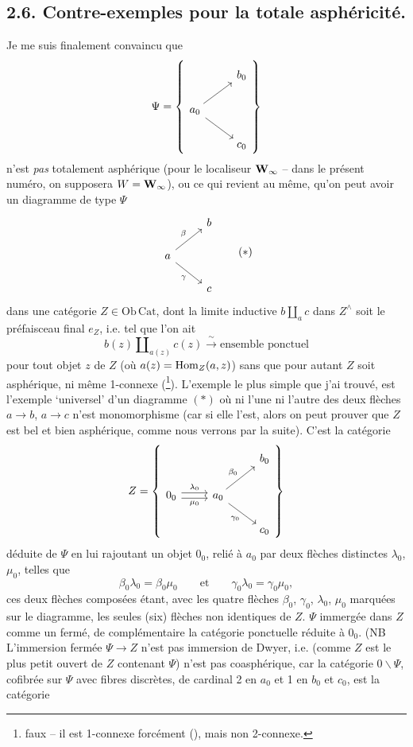 \subsection*{2.6. Contre-exemples pour la totale asphéricité.}

Je me suis finalement convaincu que
\[
\Psi = \left\{
\begin{tikzcd}
& b_0 \\
a_0 \arrow[ur] \arrow[dr] & \\
& c_0
\end{tikzcd}
\right\}
\]
n'est \textit{pas} totalement asphérique (pour le localiseur $\mathbf{W}_{\infty}$ -- dans le présent numéro, on supposera $W = \mathbf{W}_{\infty}$), ou ce qui revient au même, qu'on peut avoir un diagramme de type $\Psi$
\[
\begin{tikzcd}
& b \\
a \arrow[ur, "\beta"] \arrow[dr, "\gamma"'] & \\
& c
\end{tikzcd}
\tag*{$(*)$}
\]
dans une catégorie $Z \in \mathrm{Ob}\,\mathrm{Cat}$, dont la limite inductive $b \amalg_a c$ dans $Z^{\wedge}$ soit le préfaisceau final $e_Z$, i.e. tel que l'on ait
\[ b(z) \amalg_{a(z)} c(z) \xrightarrow{\ \sim\ } \text{ensemble ponctuel} \]
pour tout objet $z$ de $Z$ (où $a(z) = \mathrm{Hom}_Z(a,z)$) sans que pour autant $Z$ soit asphérique, ni même 1-connexe (\footnote[5]{faux -- il est 1-connexe forcément (\footnotemark[6]), mais non 2-connexe.}). L'exemple le plus simple que j'ai trouvé, est l'exemple ‘universel’ d'un diagramme $(*)$ où ni l'une ni l'autre des deux flèches $a \longrightarrow b$, $a \longrightarrow c$ n'est monomorphisme (car si elle l'est, alors on peut prouver que $Z$ est bel et bien asphérique, comme nous verrons par la suite). C'est la catégorie
\[
Z = \left\{
\begin{tikzcd}
& & b_0 \\
0_0 \arrow[r, shift left, "\lambda_0"] \arrow[r, shift right, "\mu_0"'] & a_0 \arrow[ur, "\beta_0"] \arrow[dr, "\gamma_0"'] & \\
& & c_0
\end{tikzcd}
\right\}
\]
déduite de $\Psi$ en lui rajoutant un objet $0_0$, relié à $a_0$ par deux flèches distinctes $\lambda_0$, $\mu_0$, telles que
\[ \beta_0\lambda_0 = \beta_0\mu_0 \qquad \text{et} \qquad \gamma_0\lambda_0 = \gamma_0\mu_0, \]
ces deux flèches composées étant, avec les quatre flèches $\beta_0$, $\gamma_0$, $\lambda_0$, $\mu_0$ marquées sur le diagramme, les seules (six) flèches non identiques de $Z$. $\Psi$ immergée dans $Z$ comme un fermé, de complémentaire la catégorie ponctuelle réduite à $0_0$. (NB L'immersion fermée $\Psi \longrightarrow Z$ n'est pas immersion de Dwyer, i.e. (comme $Z$ est le plus petit ouvert de $Z$ contenant $\Psi$) n'est pas coasphérique, car la catégorie $0\backslash\Psi$, cofibrée sur $\Psi$ avec fibres discrètes, de cardinal 2 en $a_0$ et 1 en $b_0$ et $c_0$, est la catégorie
